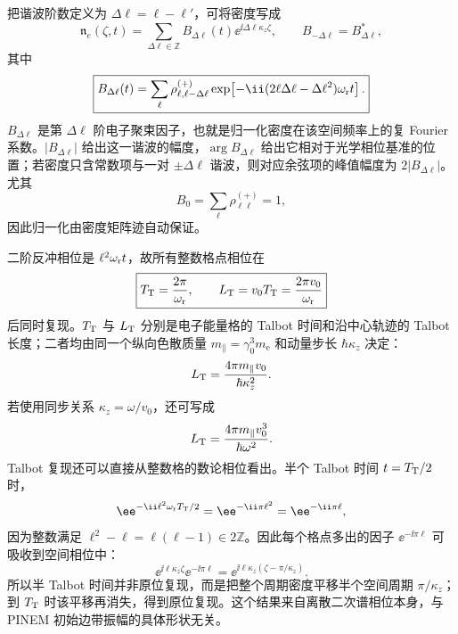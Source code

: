 把谐波阶数定义为 $\Delta\ell=\ell-\ell'$，可将密度写成
\begin{equation}
 \mathfrak n_e(\zeta,t)
 =\sum_{\Delta\ell\in\mathbb Z}B_{\Delta\ell}(t)\ee^{\ii \Delta\ell\kappa_z\zeta},
 \qquad B_{-\Delta\ell}=B_{\Delta\ell}^*,
\label{eq:electron_density_harmonic_expansion_dp46}
\end{equation}
其中
\begin{equation}
\boxed{
 B_{\Delta\ell}(t)
 =\sum_{\ell}
 \rho_{\ell,\ell-\Delta\ell}^{(+)}
 \exp\!\left[-\ii(2\ell \Delta\ell-\Delta\ell^2)\omega_{\rm r}t\right].}
\label{eq:electron_bunching_harmonic_dp46}
\end{equation}
$B_{\Delta\ell}$ 是第 $\Delta\ell$ 阶电子聚束因子，也就是归一化密度在该空间频率上的复 Fourier 系数。$|B_{\Delta\ell}|$ 给出这一谐波的幅度，$\arg B_{\Delta\ell}$ 给出它相对于光学相位基准的位置；若密度只含常数项与一对 $\pm\Delta\ell$ 谐波，则对应余弦项的峰值幅度为 $2|B_{\Delta\ell}|$。尤其
\begin{equation*}
 B_0=\sum_\ell\rho_{\ell\ell}^{(+)}=1,
\end{equation*}
因此归一化由密度矩阵迹自动保证。

二阶反冲相位是 $\ell^2\omega_{\rm r}t$，故所有整数格点相位在
\begin{equation}
\boxed{
 T_{\rm T}=\frac{2\pi}{\omega_{\rm r}},
 \qquad
 L_{\rm T}=v_0T_{\rm T}
 =\frac{2\pi v_0}{\omega_{\rm r}}}
\label{eq:electron_talbot_time_length_dp46}
\end{equation}
后同时复现。$T_{\rm T}$ 与 $L_{\rm T}$ 分别是电子能量格的 Talbot 时间和沿中心轨迹的 Talbot 长度；二者均由同一个纵向色散质量
$m_\parallel=\gamma_0^3m_{\mathrm e}$ 和动量步长 $\hbar \kappa_z$ 决定：
\begin{equation*}
 L_{\rm T}
 =\frac{4\pi m_\parallel v_0}{\hbar \kappa_z^2}.
\end{equation*}
若使用同步关系 $\kappa_z=\omega/v_0$，还可写成
\begin{equation*}
 L_{\rm T}
 =\frac{4\pi m_\parallel v_0^3}{\hbar\omega^2}.
\end{equation*}
Talbot 复现还可以直接从整数格的数论相位看出。半个 Talbot 时间 $t=T_{\rm T}/2$ 时，
\begin{equation*}
 \ee^{-\ii\ell^2\omega_{\rm r}T_{\rm T}/2}
 =\ee^{-\ii\pi\ell^2}
 =\ee^{-\ii\pi\ell},
\end{equation*}
因为整数满足 $\ell^2-\ell=\ell(\ell-1)\in2\mathbb Z$。因此每个格点多出的因子 $\ee^{-\ii\pi\ell}$ 可吸收到空间相位中：
\begin{equation*}
 \ee^{\ii\ell\kappa_z\zeta}\ee^{-\ii\pi\ell}
 =\ee^{\ii\ell\kappa_z(\zeta-\pi/\kappa_z)}.
\end{equation*}
所以半 Talbot 时间并非原位复现，而是把整个周期密度平移半个空间周期 $\pi/\kappa_z$；到 $T_{\rm T}$ 时该平移再消失，得到原位复现。这个结果来自离散二次谱相位本身，与 PINEM 初始边带振幅的具体形状无关。

